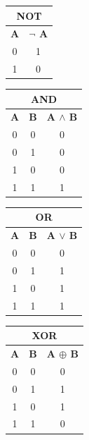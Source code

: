\documentclass[a4paper,10pt]{article}
\begin{document}
\begin{center}
\begin{minipage}[t]{0.24\textwidth}
    \centering
    \begin{tabular}{|c|c|}
        \hline
        \multicolumn{2}{|c|}{\textbf{NOT}} \\
        \hline
        \textbf{A} & \textbf{$\neg$ A} \\
        \hline
        0 & 1 \\
        1 & 0 \\
        \hline
    \end{tabular}
\end{minipage}\hfill
\begin{minipage}[t]{0.24\textwidth}
    \centering
    \begin{tabular}{|c c|c|}
        \hline
        \multicolumn{3}{|c|}{\textbf{AND}} \\
        \hline
        \textbf{A} & \textbf{B} & \textbf{A $\land$ B} \\
        \hline
        0 & 0 & 0 \\
        0 & 1 & 0 \\
        1 & 0 & 0 \\
        1 & 1 & 1 \\
        \hline
    \end{tabular}
\end{minipage}\hfill
\begin{minipage}[t]{0.24\textwidth}
    \centering
    \begin{tabular}{|c c|c|}
        \hline
        \multicolumn{3}{|c|}{\textbf{OR}} \\
        \hline
        \textbf{A} & \textbf{B} & \textbf{A $\lor$ B} \\
        \hline
        0 & 0 & 0 \\
        0 & 1 & 1 \\
        1 & 0 & 1 \\
        1 & 1 & 1 \\
        \hline
    \end{tabular}
\end{minipage}\hfill
\begin{minipage}[t]{0.24\textwidth}
    \centering
    \begin{tabular}{|c c|c|}
        \hline
        \multicolumn{3}{|c|}{\textbf{XOR}} \\
        \hline
        \textbf{A} & \textbf{B} & \textbf{A $\oplus$ B} \\
        \hline
        0 & 0 & 0 \\
        0 & 1 & 1 \\
        1 & 0 & 1 \\
        1 & 1 & 0 \\
        \hline
    \end{tabular}
\end{minipage}
\end{center}
\end{document}
